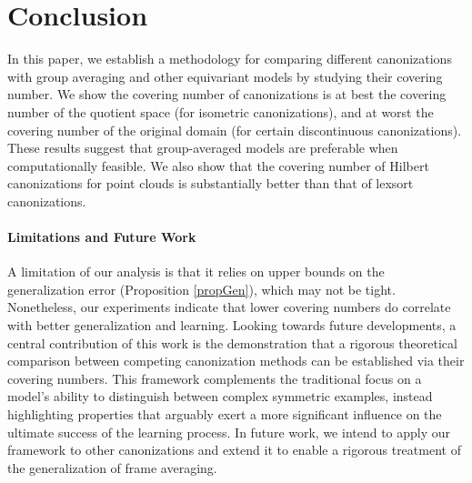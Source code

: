 \documentclass{article}
\theoremstyle{definition}
\theoremstyle{plain}
\begin{document}
 
\section{Conclusion}
In this paper, we establish a methodology for comparing different canonizations with group averaging and other equivariant models by studying their covering number. We show the covering number of canonizations is at best the covering number of the quotient space (for isometric canonizations), and at worst the covering number of the original domain (for certain discontinuous canonizations). These results suggest that group-averaged models are preferable when computationally feasible. We also show that the covering number of Hilbert canonizations for point clouds is substantially better than that of lexsort canonizations. 

\paragraph{Limitations and Future Work}
A limitation of our analysis is that it relies on upper bounds on the generalization error (Proposition \ref{propGen}), which may not be tight. Nonetheless, our experiments indicate that lower covering numbers do correlate with better generalization and learning. Looking towards future developments, a central contribution of this work is the demonstration that a rigorous theoretical comparison between competing canonization methods can be established via their covering numbers. This framework complements the traditional focus on a model's ability to distinguish between complex symmetric examples, instead highlighting properties that arguably exert a more significant influence on the ultimate success of the learning process. In future work, we intend to apply our framework to other canonizations and extend it to enable a rigorous treatment of the generalization of frame averaging. 

\newpage


\newpage
\appendix


\end{document}
